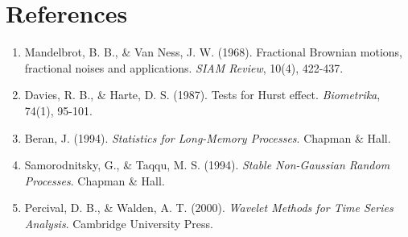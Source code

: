 \documentclass[11pt,a4paper]{article}
\begin{document}
\section{References}

\begin{enumerate}
    \item Mandelbrot, B. B., \& Van Ness, J. W. (1968). Fractional Brownian motions, fractional noises and applications. \textit{SIAM Review}, 10(4), 422-437.
    
    \item Davies, R. B., \& Harte, D. S. (1987). Tests for Hurst effect. \textit{Biometrika}, 74(1), 95-101.
    
    \item Beran, J. (1994). \textit{Statistics for Long-Memory Processes}. Chapman \& Hall.
    
    \item Samorodnitsky, G., \& Taqqu, M. S. (1994). \textit{Stable Non-Gaussian Random Processes}. Chapman \& Hall.
    
    \item Percival, D. B., \& Walden, A. T. (2000). \textit{Wavelet Methods for Time Series Analysis}. Cambridge University Press.
\end{enumerate}
\end{document}

